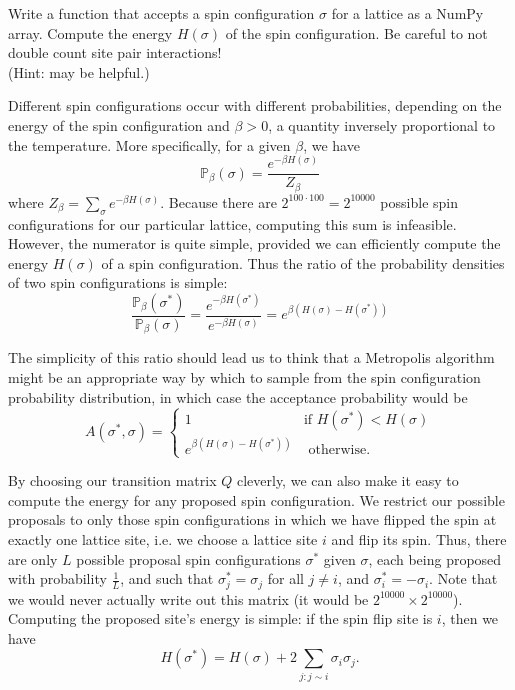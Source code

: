 \begin{problem} %
Write a function that accepts a spin configuration $\sigma$ for a lattice as a NumPy array.
Compute the energy $H(\sigma)$ of the spin configuration.
Be careful to not double count site pair interactions!
\\(Hint:  may be helpful.)
\end{problem}

Different spin configurations occur with different probabilities, depending on the energy of the spin configuration and $\beta > 0$, a quantity inversely proportional to the temperature.
More specifically, for a given $\beta$, we have
\begin{equation*}
\mathbb{P}_{\beta}(\sigma) = \frac{e^{-\beta H(\sigma)}}{Z_{\beta}}
\end{equation*}
where $Z_{\beta} = \sum_{\sigma} e^{-\beta H(\sigma)}$.
Because there are $2^{100 \cdot 100} = 2^{10000}$ possible spin configurations for our particular lattice, computing this sum is infeasible.
However, the numerator is quite simple, provided we can efficiently compute the energy $H(\sigma)$ of a spin configuration.
Thus the ratio of the probability densities of two spin configurations is simple:
\begin{equation*}
\frac{\mathbb{P}_{\beta}(\sigma^{*})}{\mathbb{P}_{\beta}(\sigma)}
= \frac{e^{-\beta H(\sigma^{*})}}{e^{-\beta H(\sigma)}}
= e^{\beta (H(\sigma) - H(\sigma^{*}))}
\end{equation*}

The simplicity of this ratio should lead us to think that a Metropolis algorithm might be an appropriate way by which to sample from the spin configuration probability distribution, in which case the acceptance probability would be
\begin{equation}
A(\sigma^{*}, \sigma) = \begin{cases} 1 & \mbox{if } H(\sigma^{*}) < H(\sigma) \\ e^{\beta (H(\sigma) - H(\sigma^{*}))} & \mbox{ otherwise.} \end{cases}
\label{eq:ising-acceptance}
\end{equation}

By choosing our transition matrix $Q$ cleverly, we can also make it easy to compute the energy for any proposed spin configuration.
We restrict our possible proposals to only those spin configurations in which we have flipped the spin at exactly one lattice site, i.e. we choose a lattice site $i$ and flip its spin.
Thus, there are only $L$ possible proposal spin configurations $\sigma^{*}$ given $\sigma$, each being proposed with probability $\frac{1}{L}$, and such that $\sigma_{j}^{*} = \sigma_{j}$ for all $j \neq i$, and $\sigma_{i}^{*} = - \sigma_{i}$.
Note that we would never actually write out this matrix (it would be $2^{10000} \times 2^{10000}$).
Computing the proposed site's energy is simple: if the spin flip site is $i$, then we have
\begin{equation}
H(\sigma^{*}) = H(\sigma) + 2\sum_{j: j \sim i} \sigma_{i}\sigma_{j}.
\label{eq:ising-new-spin-energy}
\end{equation}

